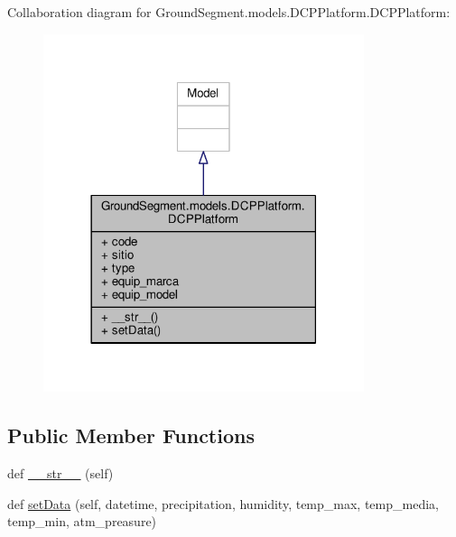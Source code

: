 Collaboration diagram for Ground\+Segment.\+models.\+D\+C\+P\+Platform.\+D\+C\+P\+Platform\+:\nopagebreak
\begin{figure}[H]
\begin{center}
\leavevmode
\includegraphics[width=266pt]{class_ground_segment_1_1models_1_1_d_c_p_platform_1_1_d_c_p_platform__coll__graph}
\end{center}
\end{figure}
\subsection*{Public Member Functions}
\begin{DoxyCompactItemize}
\item 
def \hyperlink{class_ground_segment_1_1models_1_1_d_c_p_platform_1_1_d_c_p_platform_a220b5f4f794b750e6e14bf99b5aa3d0e}{\+\_\+\+\_\+str\+\_\+\+\_\+} (self)
\item 
def \hyperlink{class_ground_segment_1_1models_1_1_d_c_p_platform_1_1_d_c_p_platform_a126c135e9c8024953befa772e163e405}{set\+Data} (self, datetime, precipitation, humidity, temp\+\_\+max, temp\+\_\+media, temp\+\_\+min, atm\+\_\+preasure)
\end{DoxyCompactItemize}
